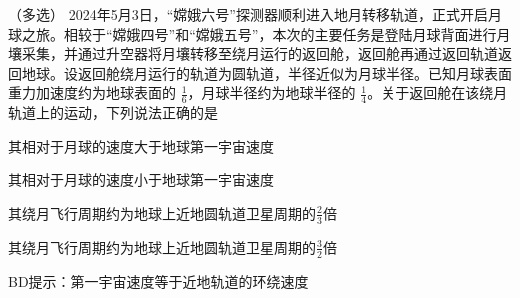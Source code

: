 （多选）
2024年5月3日，“嫦娥六号”探测器顺利进入地月转移轨道，正式开启月球之旅。相较于“嫦娥四号”和“嫦娥五号”，本次的主要任务是登陆月球背面进行月壤采集，并通过升空器将月壤转移至绕月运行的返回舱，返回舱再通过返回轨道返回地球。设返回舱绕月运行的轨道为圆轨道，半径近似为月球半径。已知月球表面重力加速度约为地球表面的 \(\frac{1}{6}\)，月球半径约为地球半径的 \(\frac{1}{4}\)。关于返回舱在该绕月轨道上的运动，下列说法正确的是\paren[]
\begin{choices}
	\item 其相对于月球的速度大于地球第一宇宙速度
	\item 其相对于月球的速度小于地球第一宇宙速度
	\item 其绕月飞行周期约为地球上近地圆轨道卫星周期的\(\frac{2}{3}\)倍
	\item 其绕月飞行周期约为地球上近地圆轨道卫星周期的\(\frac{3}{2}\)倍
\end{choices}
\begin{answer}
	BD\qquad 提示：第一宇宙速度等于近地轨道的环绕速度
\end{answer}